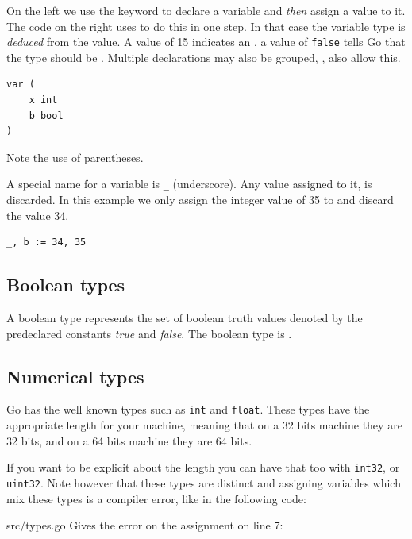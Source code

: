 On the left we use the
 keyword to declare a variable and \emph{then} assign a value to
it. The code on the right uses \mbox{\key{:=}{ }} to do this in one step. 
In that case the variable
type is \emph{deduced} from the value. A value of 15 indicates an ,
a value of \texttt{false} tells Go that the type should be . 
Multiple  declarations may also be grouped, ,
 also allow this.
\begin{lstlisting}
var (
    x int
    b bool
)
\end{lstlisting}
Note the use of parentheses.

A special name for a variable is \texttt{\_} (underscore). Any value
assigned to it, is discarded. In this example we only assign the integer
value of 35 to  and discard the value 34.
\begin{lstlisting}
_, b := 34, 35
\end{lstlisting}

\subsection{Boolean types}
A boolean type represents the set of boolean truth values denoted by the
predeclared constants \emph{true} and \emph{false}. The boolean type is .

\subsection{Numerical types}
Go has the well known types such as \lstinline{int} and
\lstinline{float}. These types have the appropriate length for your
machine, meaning that on a 32 bits machine they are 32 bits, and on
a 64 bits machine they are 64 bits.

If you want to be explicit about the length you can have
that too with \lstinline{int32}, or \lstinline{uint32}. Note however
that these types are distinct and assigning variables which mix
these types is a compiler error, like in the following code:


{src/types.go}
Gives the error on the assignment on line 7:

\noindent{}

